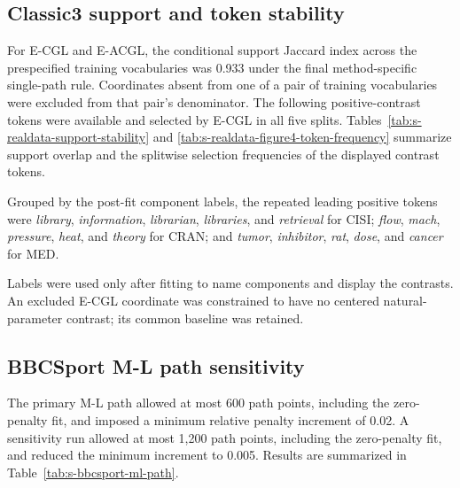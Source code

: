 \documentclass[preprint,12pt,authoryear]{elsarticle}
\begin{document}
\subsection{Classic3 support and token stability}

For E-CGL and E-ACGL, the conditional support Jaccard index across the prespecified
training vocabularies was 0.933 under the final method-specific single-path
rule. Coordinates absent
from one of a pair of training vocabularies were excluded from that pair's
denominator. The following positive-contrast tokens were available and
selected by E-CGL in all five splits. Tables~\ref{tab:s-realdata-support-stability}
and \ref{tab:s-realdata-figure4-token-frequency} summarize support overlap and
the splitwise selection frequencies of the displayed contrast tokens.

Grouped by the post-fit component labels, the repeated leading positive tokens
were \emph{library}, \emph{information}, \emph{librarian}, \emph{libraries},
and \emph{retrieval} for CISI; \emph{flow}, \emph{mach}, \emph{pressure},
\emph{heat}, and \emph{theory} for CRAN; and \emph{tumor}, \emph{inhibitor},
\emph{rat}, \emph{dose}, and \emph{cancer} for MED.

Labels were used only after fitting to name components and display the
contrasts. An excluded E-CGL coordinate was constrained to have no centered
natural-parameter contrast; its common baseline was retained.

\FloatBarrier





\FloatBarrier

\clearpage
\subsection{BBCSport M-L path sensitivity}

The primary M-L path allowed at most 600 path points, including the
zero-penalty fit, and imposed a minimum relative penalty increment of 0.02. A
sensitivity run allowed at most 1,200 path points, including the zero-penalty
fit, and reduced the minimum increment to 0.005. Results are summarized in
Table~\ref{tab:s-bbcsport-ml-path}.
\end{document}
